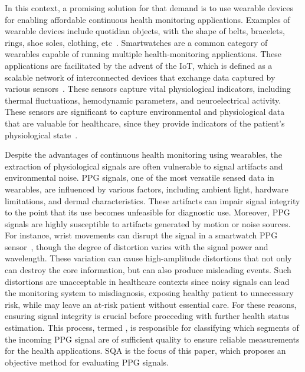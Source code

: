 \documentclass[final,3p,times,twocolumn]{elsarticle}
\begin{document}
In this context, a promising solution for that demand is to use wearable devices for enabling affordable continuous health monitoring applications.
Examples of wearable devices include quotidian objects, with the shape of belts, bracelets, rings, shoe soles, clothing, etc~\cite{van2024smart}.
Smartwatches are a common category of wearables capable of running multiple health-monitoring applications.
These applications are facilitated by the advent of the \gls{IoT}, which is defined as a scalable network of interconnected devices that exchange data captured by various sensors~\cite{aouedi2024survey}.
These sensors capture vital physiological indicators, including thermal fluctuations, hemodynamic parameters, and neuroelectrical activity.
These sensors are significant to capture environmental and physiological data that are valuable for healthcare, since they provide indicators of the patient's physiological state~\cite{ECG-diagnosis}. 



Despite the advantages of continuous health monitoring using wearables, the extraction of physiological signals are often vulnerable to signal artifacts and environmental noise. 
\gls{PPG} signals, one of the most versatile sensed data in wearables, are influenced by various factors, including ambient light, hardware limitations, and dermal characteristics. These artifacts can impair signal integrity to the point that its use becomes unfeasible for diagnostic use.
Moreover, \gls{PPG} signals are highly susceptible to artifacts generated by motion or noise sources. For instance, wrist movements can disrupt the signal in a smartwatch \gls{PPG} sensor~\cite{ppg-1}, though the degree of distortion varies with the signal power and wavelength. These variation can cause high-amplitude distortions that not only can destroy the core information, but can also produce misleading events. 
Such distortions are unacceptable in healthcare contexts since noisy signals can lead the monitoring system to misdiagnosis, exposing healthy patient to unnecessary risk, while may leave an at-risk patient without essential care.
For these reasons, ensuring signal integrity is crucial before proceeding with further health status estimation.
This process, termed , is responsible for classifying which segments of the incoming \gls{PPG} signal are of sufficient quality to ensure reliable measurements for the health applications.
\gls{SQA} is the focus of this paper, which proposes an objective method for evaluating \gls{PPG} signals.
\end{document}
